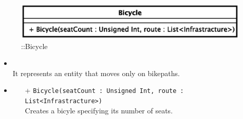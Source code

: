 \begin{figure}[h]
\centering
\includegraphics[scale=0.6,keepaspectratio]{images/solution/app/backend/bicycle.eps}
\caption{\pActive::Bicycle}
\label{fig:sd-app-bicycle}
\end{figure}
\FloatBarrier
\begin{itemize}
  \item \textbf{\descr} \\
It represents an entity that moves only on bikepaths.
  \item \textbf{\ops}
  \begin{itemize}
  \item[+] \texttt{Bicycle(seatCount : Unsigned Int, route : List<Infrastracture>)} \\
Creates a bicyle specifying its number of seats.
  \end{itemize}
\end{itemize} 
